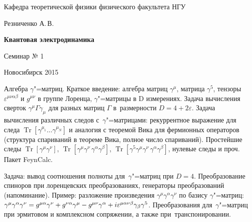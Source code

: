 \documentclass[12pt,pagesize,paper=192mm:108mm]{scrbook}
\DeclareMathOperator{\Tr}{Tr}
\newcommand*{\hm}[1]{#1\nobreak\discretionary{}%
  {\hbox{$\mathsurround=0pt #1$}}{}}
\renewcommand{\epsilon}{\varepsilon}
\begin{document}
\begin{titlepage}
\begin{center}
    Кафедра теоретической физики физического факультета НГУ
    \medskip

    \Large
    Резниченко А.\,В.
    \bigskip

    \huge
    \textbf{Квантовая электродинамика}
    \bigskip

    \Large
    Семинар № 1
    \vfill

    \normalsize
    \vfill

    \normalsize \ccbysa\hspace{0.5em}  Новосибирск 2015
  \end{center}
\end{titlepage}
\newpage

\vspace*{-1em}
\begin{center}
\vfill
  \begin{minipage}{0.65\linewidth}
    Алгебра $\gamma$"=матриц.  Краткое введение: алгебра матриц
    $\gamma^{\mu}$, матрица $\gamma^5$, тензоры
    $\epsilon^{\mu\nu\alpha\beta}$ и $g^{\mu\nu}$ в группе Лоренца,
    $\gamma$"=матрицы в D измерениях.
    Задача вычисления сверток $\gamma^{\mu}\Gamma\gamma_{\mu}$ для
    разных матриц $\Gamma$ в~размерности $D=4+2\epsilon$.
    Задача вычисления различных следов с~$\gamma$"=матрицами:
    рекуррентное выражение для следа $\Tr[\gamma^{\mu_1}\ldots
    \gamma^{\mu_N}]$ и аналогия с теоремой Вика для фермионных
    операторов (структура спариваний в теореме Вика, полное число
    спариваний). Простейшие следы $\Tr[\gamma^{\mu}\gamma^{\nu}]$,
    $\Tr[\gamma^{\mu}\gamma^{\nu}\,\gamma^{\alpha}\gamma^{\beta}]$,
    $\Tr[\gamma^5\gamma^{\mu}\gamma^{\nu}\,\gamma^{\alpha}\gamma^{\beta}]$,
    нулевые следы и проч. Пакет FeynCalc.
    \smallskip

    Задача: вывод соотношения полноты для~$\gamma$"=матриц при
    $D=4$. Преобразование спиноров при лоренцевских преобразованиях,
    генераторы преобразований (напоминание). Пример: разложение
    произведения $\gamma^{\mu}\gamma^{\alpha}\gamma^{\nu}$ по базису
    $\gamma$"=матриц: $\gamma^{\mu}\gamma^{\alpha}\gamma^{\nu}=
    g^{\mu\alpha}\gamma^{\nu} + g^{\nu\alpha}\gamma^{\mu}\hm{-}
    g^{\mu\nu}\gamma^{\alpha}+ i \epsilon^{\mu\alpha\nu\beta}\gamma_{\beta}
    \gamma^5$.  
    Преобразования для~$\gamma$"=матриц при эрмитовом и комплексном
    сопряжении, а также при~транспонировании.
  \end{minipage}
  \vfill

\end{center}
\end{document}
